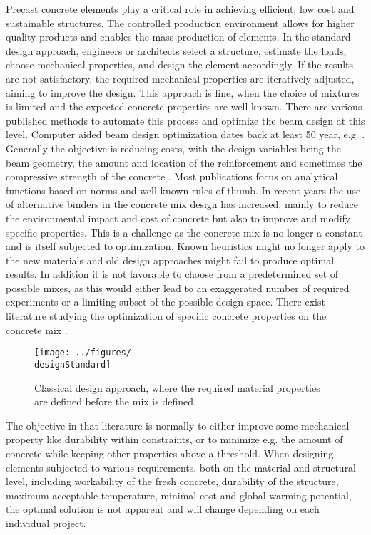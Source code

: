 Precast concrete elements play a critical role in achieving efficient, low cost and sustainable structures.
The controlled production environment allows for higher quality products and enables the mass production of elements.
In the standard design approach, engineers or architects select a structure, estimate the loads, choose mechanical properties, and design the element accordingly. 
If the results are not satisfactory, the required mechanical properties are iteratively adjusted, aiming to improve the design.
This approach is fine, when the choice of mixtures is limited and the expected concrete properties are well known.
There are various published methods to automate this process and optimize the beam design at this level.
Computer aided beam design optimization dates back at least 50 year, e.g. \cite{Haung1967}.
Generally the objective is reducing costs, with the design variables being the beam geometry, the amount and location of the reinforcement and sometimes the compressive strength of the concrete \cite{Chakrabarty_1992, Coello_1997, Pierott_2021, Shobeiri_2023} .
Most publications focus on analytical functions based on norms and well known rules of thumb.
In recent years the use of alternative binders in the concrete mix design has increased, mainly to reduce the environmental impact and cost of concrete but also to improve and modify specific properties.
This is a challenge as the concrete mix is no longer a constant and is itself subjected to optimization.
Known heuristics might no longer apply to the new materials and old design approaches might fail to produce optimal results.
In addition it is not favorable to choose from a predetermined set of possible mixes, as this would either lead to an exaggerated number of required experiments or a limiting subset of the possible design space.
There exist literature studying the optimization of specific concrete properties on the concrete mix \cite{Lisienkova_2021, Kondapally_2022}.
\begin{figure}[b]%
	\centering
	\texttt{[image: ../figures/\\designStandard]}
	\caption{Classical design approach, where the required material properties are defined before the mix is defined.}\label{fig:standard_design}
\end{figure}
The objective in that literature is normally to either improve some mechanical property like durability within constraints, or to minimize e.g. the amount of concrete while keeping other properties above a threshold.
When designing elements subjected to various requirements, both on the material and structural level, including workability of the fresh concrete, durability of the structure, maximum acceptable temperature, minimal cost and global warming potential, the optimal solution is not apparent and will change depending on each individual project.
